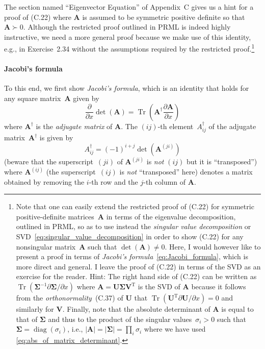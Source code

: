 \documentclass[12pt,a4paper]{article}
\newcommand{\parhead}[1]{%
\paragraph{#1}
\addcontentsline{toc}{subsubsection}{#1}}
\begin{document}
The section named ``Eigenvector Equation'' of Appendix~C gives us a hint for a proof of (C.22)
where $\mathbf{A}$ is assumed to be symmetric positive definite so that $\mathbf{A} \succ 0$.
Although the restricted proof outlined in PRML is indeed highly instructive,
we need a more general proof because we make use of this identity, e.g., in Exercise~2.34
without the assumptions required by the restricted proof.\footnote{%
Note that one can easily extend
the restricted proof of (C.22) for symmetric positive-definite matrices~$\mathbf{A}$
in terms of the eigenvalue decomposition, outlined in PRML,
so as to use instead the \emph{singular value decomposition} or
SVD~\eqref{eq:singular_value_decomposition}
in order to show (C.22) for any nonsingular matrix~$\mathbf{A}$
such that $\operatorname{det}(\mathbf{A}) \neq 0$.
Here, I would however like to present a proof
in terms of \emph{Jacobi's formula}~\eqref{eq:Jacobi_formula},
which is more direct and general.
I leave the proof of (C.22) in terms of the SVD as an exercise for the reader.
Hint: The right hand side of (C.22) can be written as
$\operatorname{Tr}\left(\bm{\Sigma}^{-1}\partial\bm{\Sigma}/\partial x\right)$
where $\mathbf{A} = \mathbf{U}\bm{\Sigma}\mathbf{V}^{\operatorname{T}}$ is the SVD of $\mathbf{A}$
because it follows from the \emph{orthonormality}~(C.37) of $\mathbf{U}$ that
$\operatorname{Tr}(\mathbf{U}^{\operatorname{T}}\partial\mathbf{U}/\partial x) = 0$
and similarly for $\mathbf{V}$.
Finally, note that the absolute determinant of $\mathbf{A}$ is equal to that of $\bm{\Sigma}$ and
thus to the product of the singular values~$\sigma_i > 0$ such that
$\bm{\Sigma} = \operatorname{diag}\left( \sigma_i \right)$, i.e.,
$\left|\mathbf{A}\right| = \left|\bm{\Sigma}\right| = \prod_i \sigma_i$
where we have used \eqref{eq:abs_of_matrix_determinant}.}

\parhead{Jacobi's formula}
To this end, we first show \emph{Jacobi's formula},
which is an identity that holds for any square matrix~$\mathbf{A}$ given by
\begin{equation}
\frac{\partial}{\partial x} \operatorname{det}\left(\mathbf{A}\right) =
\operatorname{Tr}\left(\mathbf{A}^{\dagger}\frac{\partial\mathbf{A}}{\partial x}\right)
\label{eq:Jacobi_formula}
\end{equation}
where $\mathbf{A}^{\dagger}$ is the \emph{adjugate matrix} of
$\mathbf{A}$.
The $(ij)$-th element~$A_{ij}^{\dagger}$ of the adjugate matrix~$\mathbf{A}^{\dagger}$ is given by
\begin{equation}
A_{ij}^{\dagger} = (-1)^{i+j} \operatorname{det}\left(\mathbf{A}^{(ji)}\right)
\label{eq:definition_of_adjugate}
\end{equation}
(beware that the superscript~$(ji)$ of $\mathbf{A}^{(ji)}$ is \emph{not} $(ij)$ but
it is ``transposed'')
where $\mathbf{A}^{(ij)}$ (the superscript~$(ij)$ is \emph{not} ``transposed'' here)
denotes a matrix obtained by removing
the $i$-th row and the $j$-th column of $\mathbf{A}$.
\end{document}
